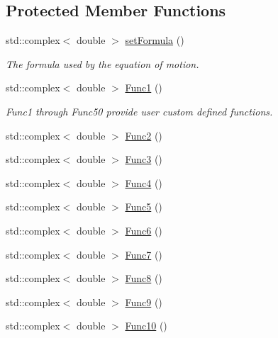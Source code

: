 \subsection*{Protected Member Functions}
\begin{DoxyCompactItemize}
\item 
std\-::complex$<$ double $>$ \hyperlink{classosea_1_1ofreq_1_1_eqn_translation_af2681a6f73df8e8518d81eba5ac9152e}{set\-Formula} ()
\begin{DoxyCompactList}\small\item\em The formula used by the equation of motion. \end{DoxyCompactList}\item 
std\-::complex$<$ double $>$ \hyperlink{classosea_1_1ofreq_1_1_eqn_translation_a147be15e86663c1af76ca2ecaeece82d}{Func1} ()
\begin{DoxyCompactList}\small\item\em Func1 through Func50 provide user custom defined functions. \end{DoxyCompactList}\item 
std\-::complex$<$ double $>$ \hyperlink{classosea_1_1ofreq_1_1_eqn_translation_ac2bdafda8b9be19c5b7432a4bd47dcf0}{Func2} ()
\item 
std\-::complex$<$ double $>$ \hyperlink{classosea_1_1ofreq_1_1_eqn_translation_acf2fcd62e136144499258d4ec5bfb6f5}{Func3} ()
\item 
std\-::complex$<$ double $>$ \hyperlink{classosea_1_1ofreq_1_1_eqn_translation_a1db00d610095489d2a06d69692a0dc48}{Func4} ()
\item 
std\-::complex$<$ double $>$ \hyperlink{classosea_1_1ofreq_1_1_eqn_translation_a37eb73b4fed858ff008c0ba4d333b1f8}{Func5} ()
\item 
std\-::complex$<$ double $>$ \hyperlink{classosea_1_1ofreq_1_1_eqn_translation_aa094532bc1384cabaf532573e8ab3db7}{Func6} ()
\item 
std\-::complex$<$ double $>$ \hyperlink{classosea_1_1ofreq_1_1_eqn_translation_a606323f2a3caab467e05e76b987bce19}{Func7} ()
\item 
std\-::complex$<$ double $>$ \hyperlink{classosea_1_1ofreq_1_1_eqn_translation_a1b622a723ceade1afb98c238d4dfc4c6}{Func8} ()
\item 
std\-::complex$<$ double $>$ \hyperlink{classosea_1_1ofreq_1_1_eqn_translation_aca66c64f6ad96f40a73349d47cc141fc}{Func9} ()
\item 
std\-::complex$<$ double $>$ \hyperlink{classosea_1_1ofreq_1_1_eqn_translation_ad096f9fa00ae7cc9bd031d0d170343d7}{Func10} ()

\end{DoxyCompactItemize}
